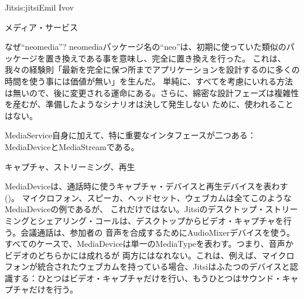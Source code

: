 \begin{aosachapter}{Jitsi}{s:jitsi}{Emil Ivov}
\begin{aosasect1}{メディア・サービス}
\begin{aosabox}{なぜ``neomedia''?}
neomediaパッケージ名の``neo''は、初期に使っていた類似のパッケージを置き換えである事を意味し、完全に置き換えを行った。
これは、我々の経験則「最新を完全に保つ所までアプリケーションを設計するのに多くの時間を使う事には価値が無い」を生んだ。
単純に、すべてを考慮にいれる方法は無いので、後に変更される運命にある。さらに、綿密な設計フェーズは複雑性を産むが、準備したようなシナリオは決して発生しない
ために、使われることはない。

\end{aosabox}

MediaService自身に加えて、特に重要なインタフェースが二つある：MediaDeviceとMediaStreamである。

\begin{aosasect2}{キャプチャ、ストリーミング、再生}

MediaDeviceは、通話時に使うキャプチャ・デバイスと再生デバイスを表わす()。
マイクロフォン、スピーカ、ヘッドセット、ウェブカムは全てこのようなMediaDeviceの例であるが、
これだけではない。Jitsiのデスクトップ・ストリーミングとシェアリング・コールは、デスクトップからビデオ・キャプチャを行う。会議通話は、参加者の
音声を合成するためにAudioMixerデバイスを使う。すべてのケースで、MediaDeviceは単一のMediaTypeを表わす。つまり、音声かビデオのどちらかには成れるが
両方にはなれない。これは、例えば、マイクロフォンが統合されたウェブカムを持っている場合、Jitsiはふたつのデバイスと認識する：ひとつはビデオ・キャプチャだけを行い、もうひとつはサウンド・キャプチャだけを行う。


\end{aosasect2}
\end{aosasect1}
\end{aosachapter}
